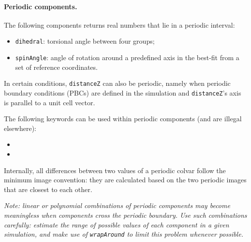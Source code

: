 \paragraph*{Periodic components.}  The following components returns
real numbers that lie in a periodic interval:
\begin{itemize}
\item \texttt{dihedral}: torsional angle between four groups;
\item \texttt{spinAngle}: angle of rotation around a predefined axis
  in the best-fit from a set of reference coordinates.
\end{itemize}
In certain conditions, \texttt{distanceZ} can also be periodic, namely
when periodic boundary conditions (PBCs) are defined in the simulation
and \texttt{distanceZ}'s axis is parallel to a unit cell vector.

The following keywords can be used within periodic components (and are
illegal elsewhere):
\begin{itemize}
\item %

\item %
\end{itemize}
Internally, all differences between two values of a periodic colvar
follow the minimum image convention: they are calculated based on
the two periodic images that are closest to each other.

\emph{Note: linear or polynomial combinations of periodic components
  may become meaningless when components cross the periodic boundary.
  Use such combinations carefully: estimate the range of possible values
  of each component in a given simulation, and make use of
  \texttt{wrapAround} to limit this problem whenever possible.}



